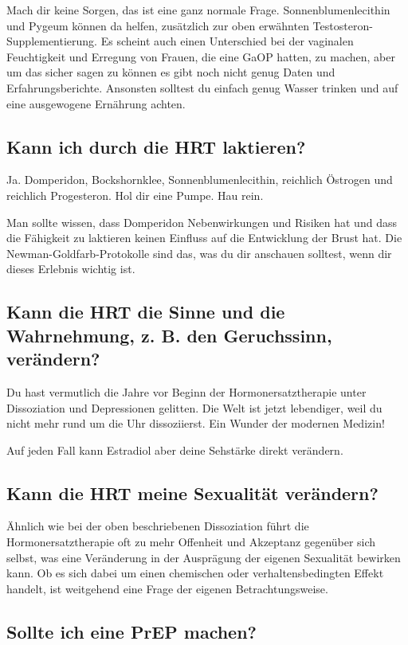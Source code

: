 \documentclass{article}
\begin{document}
Mach dir keine Sorgen, das ist eine ganz normale Frage. Sonnenblumenlecithin und Pygeum können da helfen, zusätzlich zur oben erwähnten Testosteron-Supplementierung. Es scheint auch einen Unterschied bei der vaginalen Feuchtigkeit und Erregung von Frauen, die eine GaOP hatten, zu machen, aber um das sicher sagen zu können es gibt noch nicht genug Daten und Erfahrungsberichte. Ansonsten solltest du einfach genug Wasser trinken und auf eine ausgewogene Ernährung achten.

\subsection{Kann ich durch die HRT laktieren?}

Ja. Domperidon, Bockshornklee, Sonnenblumenlecithin, reichlich Östrogen und reichlich Progesteron. Hol dir eine Pumpe. Hau rein.

Man sollte wissen, dass Domperidon Nebenwirkungen und Risiken hat und dass die Fähigkeit zu laktieren keinen Einfluss auf die Entwicklung der Brust hat. Die Newman-Goldfarb-Protokolle sind das, was du dir anschauen solltest, wenn dir dieses Erlebnis wichtig ist.

\subsection{Kann die HRT die Sinne und die Wahrnehmung, z. B. den Geruchssinn, verändern?}

Du hast vermutlich die Jahre vor Beginn der Hormonersatztherapie unter Dissoziation und Depressionen gelitten. Die Welt ist jetzt lebendiger, weil du nicht mehr rund um die Uhr dissoziierst. Ein Wunder der modernen Medizin!

Auf jeden Fall kann Estradiol aber deine Sehstärke direkt verändern.

\subsection{Kann die HRT meine Sexualität verändern?}

Ähnlich wie bei der oben beschriebenen Dissoziation führt die Hormonersatztherapie oft zu mehr Offenheit und Akzeptanz gegenüber sich selbst, was eine Veränderung in der Ausprägung der eigenen Sexualität bewirken kann. Ob es sich dabei um einen chemischen oder verhaltensbedingten Effekt handelt, ist weitgehend eine Frage der eigenen Betrachtungsweise.

\subsection{Sollte ich eine PrEP machen?}\label{11-25}
\end{document}
